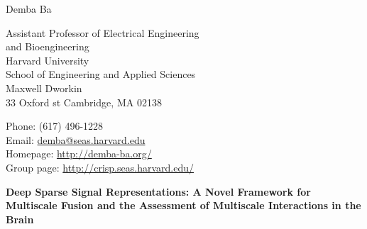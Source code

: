 \documentclass[12pt]{article}
\makeatletter
\let\saved@bibitem\@bibitem %
\def\HCode#1{}
\def\name{Demba Ba}
\makeatother
\begin{document}
\sloppy

\begingroup
\makeatletter
\let\@bibitem\saved@bibitem %
\endgroup

\HCode{<div class="fluid-container"}

\HCode{<div class="row">}
\HCode{<div class="col-md-12">}
\HCode{<h1>}
{\huge \name}
\HCode{</h1>}
\HCode{</div>} %
\HCode{</div>} %

\bigskip

\HCode{<div class="row">}
\HCode{<div class="col-md-4">}
\begin{minipage}[t]{0.5\textwidth}
  Assistant Professor of Electrical Engineering \\
  and Bioengineering \\
  Harvard University \\
  School of Engineering and Applied Sciences \\
  Maxwell Dworkin \\
  33 Oxford st
  Cambridge, MA 02138 \\
\end{minipage}
\HCode{</div>} %
\HCode{<div class="col-md-8">}
\begin{minipage}[t]{0.5\textwidth}
  Phone: (617) 496-1228 \\
  Email: \href{mailto:demba@seas.harvard.edu}{demba@seas.harvard.edu} \\
  Homepage: \href{http://demba-ba.org/}{http://demba-ba.org/} \\
  Group page: \href{http://crisp.seas.harvard.edu}{http://crisp.seas.harvard.edu/}
\end{minipage}
\HCode{</div>} %
\HCode{</div>} %

\begin{center} {\large \textbf{Deep Sparse Signal Representations: A Novel Framework for Multiscale Fusion and the Assessment of Multiscale Interactions in the Brain}}%
\end{center}
\end{document}
